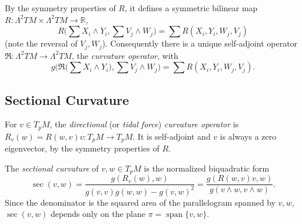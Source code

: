 \begin{definition}
  \label{def:pet-ch3-curvature-operator}
  \leanok
  By the symmetry properties of $R$, it defines a symmetric bilinear map
  $R:\Lambda^2TM\times\Lambda^2TM\to\mathbb R$,
  \[
    R\Big(\sum X_i\wedge Y_i,\sum V_j\wedge W_j\Big)=\sum R(X_i,Y_i,W_j,V_j)
  \]
  (note the reversal of $V_j,W_j$). Consequently there is a unique self-adjoint
  operator $\mathfrak R:\Lambda^2TM\to\Lambda^2TM$, the \emph{curvature operator},
  with
  \[
    g\Big(\mathfrak R\Big(\sum X_i\wedge Y_i\Big),\sum V_j\wedge W_j\Big)
    =\sum R(X_i,Y_i,W_j,V_j).
  \]
\end{definition}

\subsection{Sectional Curvature}

\begin{definition}
  \label{def:pet-ch3-directional-curvature-operator}
  \leanok
  For $v\in T_pM$, the \emph{directional} (or \emph{tidal force}) \emph{curvature
  operator} is $R_v(w)=R(w,v)v:T_pM\to T_pM$. It is self-adjoint and $v$ is always
  a zero eigenvector, by the symmetry properties of $R$.
\end{definition}

\begin{definition}
  \label{def:pet-ch3-sectional-curvature}
  \leanok
  The \emph{sectional curvature} of $v,w\in T_pM$ is the normalized biquadratic form
  \[
    \sec(v,w)=\frac{g(R_v(w),w)}{g(v,v)g(w,w)-g(v,w)^2}
    =\frac{g(R(w,v)v,w)}{g(v\wedge w,v\wedge w)}.
  \]
  Since the denominator is the squared area of the parallelogram spanned by
  $v,w$, $\sec(v,w)$ depends only on the plane $\pi=\operatorname{span}\{v,w\}$.
\end{definition}

